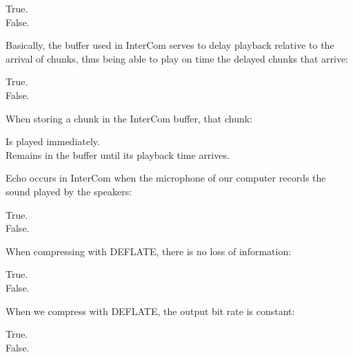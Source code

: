 \documentclass[legalpaper, 12pt, addpoints]{exam}
\begin{document}
\begin{questions}
\begin{oneparchoices}
  \choice True.\\
  \choice False.
\end{oneparchoices}

\vspace{0.10in}

\question Basically, the buffer used in InterCom serves to delay playback relative to the arrival of chunks, thus being able to play on time the delayed chunks that arrive:

\begin{oneparchoices}
  \choice True.\\
  \choice False.
\end{oneparchoices}

\vspace{0.10in}

\question When storing a chunk in the InterCom buffer, that chunk:

\begin{oneparchoices}
  \choice Is played immediately.\\
  \choice Remains in the buffer until its playback time arrives.
\end{oneparchoices}

\vspace{0.10in}

\question Echo occurs in InterCom when the microphone of our computer records the sound played by the speakers:

\begin{oneparchoices}
  \choice True.\\
  \choice False.
\end{oneparchoices}

\vspace{0.10in}

\question When compressing with DEFLATE, there is no loss of information:

\begin{oneparchoices}
  \choice True.\\
  \choice False.
\end{oneparchoices}

\question When we compress with DEFLATE, the output bit rate is constant:

\begin{oneparchoices}
  \choice True.\\
  \choice False.
\end{oneparchoices}
  
\vspace{0.10in}


\end{questions}
\end{document}
